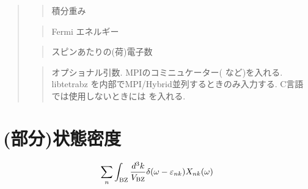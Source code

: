 \documentclass[letterpaper,10pt,dvipdfmx,openany]{sphinxmanual}
\begin{document}
\begin{quote}
\begin{quote}
\sphinxAtStartPar
積分重み
\end{quote}

\begin{sphinxVerbatim}[commandchars=\\\{\}]
\end{sphinxVerbatim}
\begin{quote}

\sphinxAtStartPar
Fermi エネルギー
\end{quote}

\begin{sphinxVerbatim}[commandchars=\\\{\}]
\end{sphinxVerbatim}
\begin{quote}

\sphinxAtStartPar
スピンあたりの(荷)電子数
\end{quote}

\begin{sphinxVerbatim}[commandchars=\\\{\}]
\end{sphinxVerbatim}
\begin{quote}

\sphinxAtStartPar
オプショナル引数.
MPIのコミニュケーター(  など)を入れる.
libtetrabz を内部でMPI/Hybrid並列するときのみ入力する.
C言語では使用しないときには  を入れる.
\end{quote}
\end{quote}


\section{(部分)状態密度}
\label{\detokenize{routine:id3}}\begin{equation*}
\begin{split}\begin{align}
\sum_{n}
\int_{\rm BZ} \frac{d^3 k}{V_{\rm BZ}}
\delta(\omega - \varepsilon_{n k})
X_{n k}(\omega)
\end{align}\end{split}
\end{equation*}
\begin{sphinxVerbatim}[commandchars=\\\{\}]
\end{sphinxVerbatim}
\end{document}
